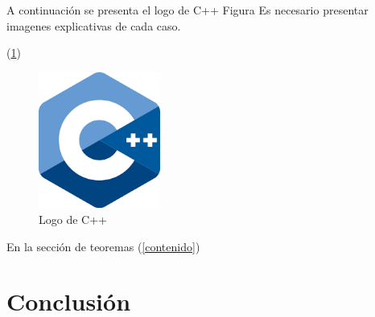 \documentclass{article}
\begin{document}
A continuación se presenta el logo de C++ Figura
Es necesario presentar imagenes explicativas de cada caso.

(\ref{fig:cpplogo})

\begin{figure}[h]
\includegraphics[width=4cm]{cpplogo.png}
\centering
\caption{Logo de C++}
\label{fig:cpplogo}
\end{figure}

En la sección de teoremas (\ref{contenido})

\section{Conclusión} \label{conclulsion}



\end{document}

